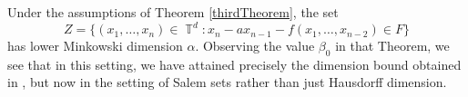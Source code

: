 \documentclass[dvipsnames,letterpaper,12pt]{article}
\numberwithin{equation}{section}
\DeclareMathOperator{\QQ}{\mathbb{Q}}
\DeclareMathOperator{\TT}{\mathbb{T}}
\numberwithin{theorem}{section}
\begin{document}
Under the assumptions of Theorem \ref{thirdTheorem}, the set
%
\[ Z = \{ (x_1,\dots,x_n) \in \TT^d: x_n - ax_{n-1} - f(x_1,\dots,x_{n-2}) \in F \} \]
%
has lower Minkowski dimension $\alpha$. Observing the value $\beta_0$ in that Theorem, we see that in this setting, we have attained precisely the dimension bound obtained in \cite{OurPaper}, but now in the setting of Salem sets rather than just Hausdorff dimension.

%
%
%
%
\end{document}
